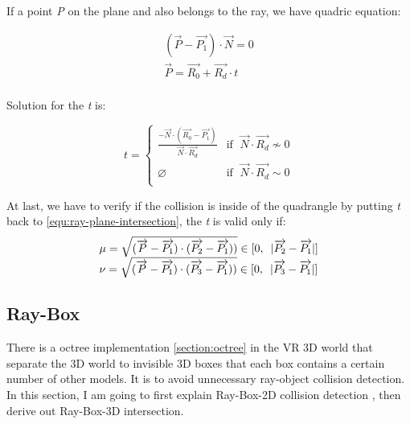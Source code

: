 If a point \emph{P} on the plane and also belongs to the ray, we have quadric equation:

\begin{equation}
\label{equ:ray-plane-intersection}
\begin{array}{lr}
(\overrightarrow{P} - \overrightarrow{P_1}) \cdot \overrightarrow{N} = 0\\
\overrightarrow{P} = \overrightarrow{R_0} + \overrightarrow{R_d} \cdot t\\
\end{array}
\end{equation}

Solution for the \emph{t} is:

\[
t =
\begin{cases}
\frac{-\overrightarrow{N} \cdot (\overrightarrow{R_0} - \overrightarrow{P_1})}{\overrightarrow{N} \cdot \overrightarrow{R_d}} & \text{if }\;\overrightarrow{N} \cdot \overrightarrow{R_d} \nsim 0\\
\varnothing & \text{if }\;\overrightarrow{N} \cdot \overrightarrow{R_d} \sim 0\\
\end{cases}
\]

At last, we have to verify if the collision is inside of the quadrangle by putting \emph{t} back to \ref{equ:ray-plane-intersection}, \parencite{stackoverflow.ray-plane.2014} the \emph{t} is valid only if:\\

\[
\begin{array}{lr}
\mu = \sqrt{(\overrightarrow{P} - \overrightarrow{P_1}) \cdot (\overrightarrow{P_2} - \overrightarrow{P_1}))} \in [0,\enspace\lvert \overrightarrow{P_2} - \overrightarrow{P_1} \rvert]\\
\nu = \sqrt{(\overrightarrow{P} - \overrightarrow{P_1}) \cdot (\overrightarrow{P_3} - \overrightarrow{P_1}))} \in [0,\enspace\lvert \overrightarrow{P_3} - \overrightarrow{P_1} \rvert]\\
\end{array}
\]

\subsection{Ray-Box}

There is a octree implementation \ref{section:octree} in the VR 3D world that separate the 3D world to invisible 3D boxes that each box contains a certain number of other models. It is to avoid unnecessary ray-object collision detection. In this section, I am going to first explain Ray-Box-2D collision detection \parencite{Tavian.ray-box-2d.2011}, then derive out Ray-Box-3D intersection.

